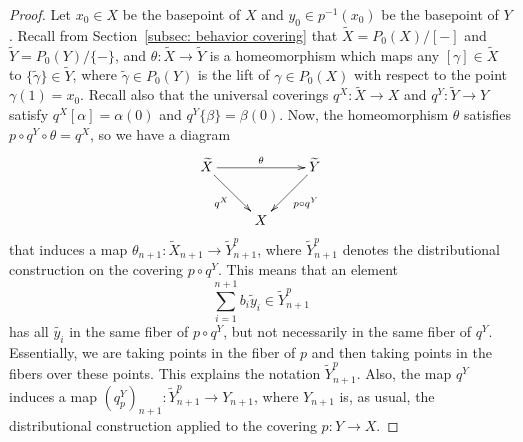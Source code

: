 \documentclass[10pt,a4paper]{amsart}
\theoremstyle{definition}
\newcommand{\Wi}{\widetilde}
\begin{document}
\begin{proof}
    Let $x_0\in X$ be the basepoint of $X$ and $y_0\in p^{-1}(x_0)$ be the basepoint of $Y$. Recall from Section~\ref{subsec: behavior covering} that $\Wi{X}=P_0(X)/[-]$ and $\Wi{Y}=P_0(Y)/\{-\}$, and $\theta\colon \Wi X\to\Wi Y$ is a homeomorphism which maps any $[\gamma]\in \Wi X$ to $\{\Wi{\gamma}\}\in \Wi Y$, where $\Wi{\gamma}\in P_0(Y)$ is the lift of $\gamma\in P_0(X)$ with respect to the point $\gamma(1)=x_0$. Recall also that the universal coverings $q^X\colon \Wi X\to X$ and $q^Y\colon \Wi Y\to Y$ satisfy $q^X[\alpha]=\alpha(0)$ and $q^Y\{\beta\}=\beta(0)$. Now, the homeomorphism $\theta$ 
satisfies $p\circ q^Y \circ \theta = q^X$, so we have a diagram
$$\xymatrix{
\Wi X \ar[rr]^-\theta \ar[dr]_-{q^X} & & \Wi Y \ar[dl]^-{p\circ q^Y} \\
& X &
} 
$$
that induces a map $\theta_{n+1}\colon \Wi X_{n+1} \to \Wi Y^p_{n+1}$, where $\Wi Y^p_{n+1}$
denotes the distributional construction on the covering $p \circ q^Y$. This means that an element
\[
\sum_{i=1}^{n+1} b_i \Wi{y}_i  \in \Wi Y^p_{n+1}
\]
has all $\Wi{y_i}$ in the same fiber of $p \circ q^Y$, but not necessarily in the same fiber
of $q^Y$. Essentially, we are taking points in the fiber of $p$ and then taking points in 
the fibers over these points. 
This explains the notation $\Wi Y^p_{n+1}$. Also, the map $q^Y$ induces a map $(q^Y_p)_{n+1} 
\colon \Wi Y^p_{n+1} \to Y_{n+1}$, where $Y_{n+1}$ is, as usual, the distributional construction applied to the covering $p\colon Y \to X$. 


\end{proof}
\end{document}
